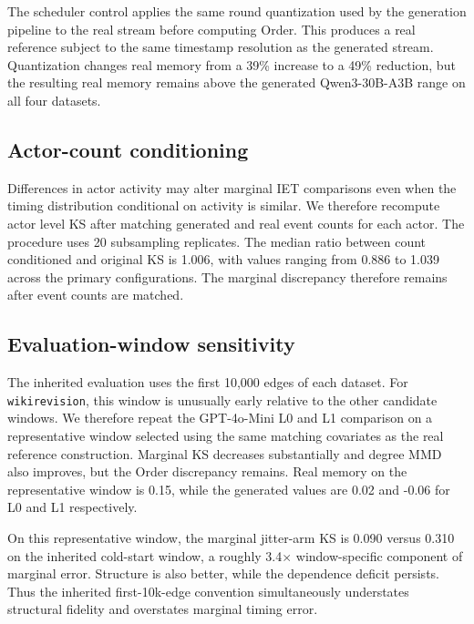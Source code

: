 The scheduler control applies the same round quantization used by the
generation pipeline to the real stream before computing Order. This produces a
real reference subject to the same timestamp resolution as the generated
stream. Quantization changes real memory from a 39\% increase to a 49\%
reduction, but the resulting real memory remains above the generated
Qwen3-30B-A3B range on all four datasets.



\subsection{Actor-count conditioning}

Differences in actor activity may alter marginal IET comparisons even when the
timing distribution conditional on activity is similar. We therefore recompute
actor level KS after matching generated and real event counts for each actor.
The procedure uses 20 subsampling replicates. The median ratio between
count conditioned and original KS is 1.006, with values ranging from 0.886 to
1.039 across the primary configurations. The marginal discrepancy therefore
remains after event counts are matched.

\subsection{Evaluation-window sensitivity}

The inherited evaluation uses the first 10,000 edges of each dataset. For
\texttt{wikirevision}, this window is unusually early relative to the other
candidate windows. We therefore repeat the GPT-4o-Mini L0 and L1 comparison on
a representative window selected using the same matching covariates as the real
reference construction. Marginal KS decreases substantially and degree MMD
also improves, but the Order discrepancy remains. Real memory on the
representative window is 0.15, while the generated values are 0.02 and -0.06
for L0 and L1 respectively.



On this representative window, the marginal jitter-arm KS is 0.090 versus
0.310 on the inherited cold-start window, a roughly 3.4$\times$
window-specific component of marginal error. Structure is also better, while
the dependence deficit persists. Thus the inherited first-10k-edge convention
simultaneously understates structural fidelity and overstates marginal timing
error.

